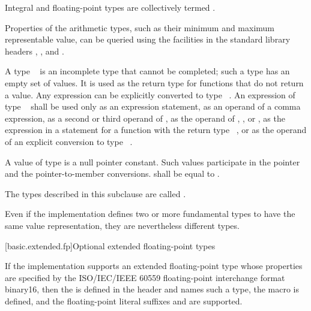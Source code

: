 \pnum
Integral and floating-point types are collectively
termed .
\begin{note}
Properties of the arithmetic types,
such as their minimum and maximum representable value,
can be queried using the facilities in the standard library headers
,
, and
.
\end{note}

\pnum
{}%
A type \cv{}~
is an incomplete type that cannot be completed; such a type has
an empty set of values. It is used as the return
type for functions that do not return a value. Any expression can be
explicitly converted to type
\cv{}~.
An expression of type \cv{}~ shall
be used only as an expression statement, as an operand
of a comma expression, as a second or third operand
of , as the operand of
, , or , as
the expression in a  statement for a function
with the return type \cv{}~, or as the operand of an explicit conversion
to type \cv{}~.

\pnum
A value of type  is a null pointer
constant. Such values participate in the pointer and the
pointer-to-member conversions.
 shall be equal to .

\pnum
{}%
The types described in this subclause
are called .
\begin{note}
Even if the implementation defines two or more fundamental types to have the
same value representation, they are nevertheless different types.
\end{note}

[basic.extended.fp]{Optional extended floating-point types}

\pnum
If the implementation supports an extended floating-point type
whose properties are specified by
the ISO/IEC/IEEE 60559 floating-point interchange format binary16,
then the  
is defined in the header  and names such a type,
the macro  is defined, and
the floating-point literal suffixes  and 
are supported.

